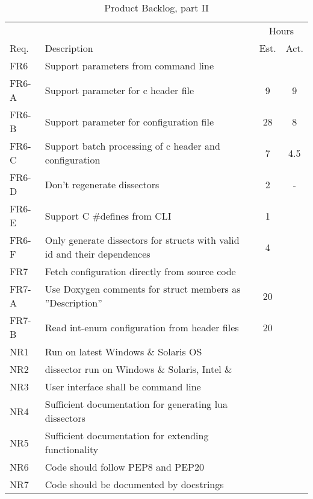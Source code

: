 \begin{table}[ht] \small \center
\caption{Product Backlog, part II \label{tab:prodbacklog2}}
\begin{tabularx}{\textwidth}{l X c c}
	\toprule
	& & \multicolumn{2}{c}{Hours} \\
	\cmidrule(r){3-4}
	Req. & Description & Est. & Act. \\
	\midrule	
	FR6 & Support parameters from command line & & \\
	FR6-A & Support parameter for \Gls{c} \gls{header} file & 9 & 9 \\
	FR6-B & Support parameter for configuration file & 28 & 8 \\
	FR6-C & Support batch processing of \Gls{c} \gls{header} and configuration & 7 & 4.5 \\
	FR6-D & Don't regenerate \glspl{dissector} & 2 & - \\
	FR6-E & Support C \#defines from CLI & 1 & \\
	FR6-F & Only generate dissectors for structs with valid id and their dependences & 4 & \\
    \addlinespace
	FR7 & Fetch configuration directly from source code & & \\
	FR7-A & Use Doxygen comments for struct members as ''Description'' & 20 & \\
	FR7-B & Read int-enum configuration from header files & 20 & \\
	\addlinespace
	NR1 & Run on latest \Gls{Windows} \& \Gls{Solaris} OS & & \\
	NR2 & \Gls{dissector} run on \Gls{Windows} \& \Gls{Solaris}, Intel \& \GLS{sparc} & & \\
	NR3 & User interface shall be command line & & \\
	NR4 & Sufficient documentation for generating \Gls{lua} \glspl{dissector} & & \\
	NR5 & Sufficient documentation for extending functionality & & \\
	NR6 & Code should follow PEP8 and PEP20 & & \\
	NR7 & Code should be documented by docstrings & & \\
	\bottomrule
\end{tabularx}
\end{table}








